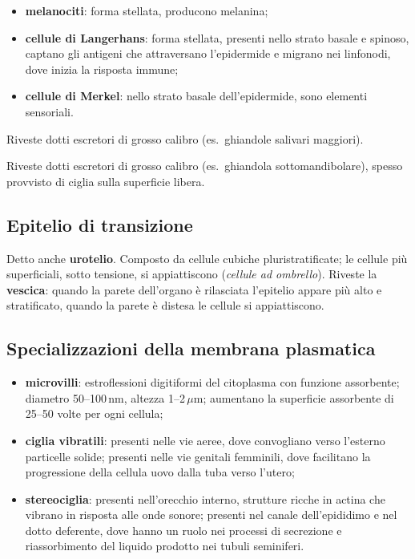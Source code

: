 \begin{itemize}
  \item \textbf{melanociti}: forma stellata, producono melanina;
  \item \textbf{cellule di Langerhans}: forma stellata, presenti nello strato basale e spinoso, captano gli antigeni che attraversano l'epidermide e migrano nei linfonodi, dove inizia la risposta immune;
  \item \textbf{cellule di Merkel}: nello strato basale dell'epidermide, sono elementi sensoriali.
\end{itemize}

Riveste dotti escretori di grosso calibro (es.\ ghiandole salivari maggiori).

Riveste dotti escretori di grosso calibro (es.\ ghiandola sottomandibolare), spesso provvisto di ciglia sulla superficie libera.

\subsection{Epitelio di transizione}
\label{ssec:transizione}

Detto anche \textbf{urotelio}. Composto da cellule cubiche pluristratificate; le cellule più superficiali, sotto tensione, si appiattiscono (\textit{cellule ad ombrello}). Riveste la \textbf{vescica}: quando la parete dell'organo è rilasciata l'epitelio appare più alto e stratificato, quando la parete è distesa le cellule si appiattiscono.

\subsection{Specializzazioni della membrana plasmatica}

\begin{itemize}
  \item \textbf{microvilli}: estroflessioni digitiformi del citoplasma con funzione assorbente; diametro 50--100\,nm, altezza 1--2\,$\mu$m; aumentano la superficie assorbente di 25--50 volte per ogni cellula;
  \item \textbf{ciglia vibratili}: presenti nelle vie aeree, dove convogliano verso l'esterno particelle solide; presenti nelle vie genitali femminili, dove facilitano la progressione della cellula uovo dalla tuba verso l'utero;
  \item \textbf{stereociglia}: presenti nell'orecchio interno, strutture ricche in actina che vibrano in risposta alle onde sonore; presenti nel canale dell'epididimo e nel dotto deferente, dove hanno un ruolo nei processi di secrezione e riassorbimento del liquido prodotto nei tubuli seminiferi.
\end{itemize}


